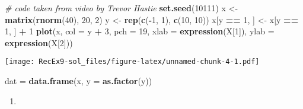 \documentclass[]{article}
\newenvironment{Shaded}{\begin{snugshade}}{\end{snugshade}}
\newcommand{\CommentTok}[1]{\textcolor[rgb]{0.56,0.35,0.01}{\textit{#1}}}
\newcommand{\DataTypeTok}[1]{\textcolor[rgb]{0.13,0.29,0.53}{#1}}
\newcommand{\DecValTok}[1]{\textcolor[rgb]{0.00,0.00,0.81}{#1}}
\newcommand{\KeywordTok}[1]{\textcolor[rgb]{0.13,0.29,0.53}{\textbf{#1}}}
\newcommand{\NormalTok}[1]{#1}
\newcommand{\OperatorTok}[1]{\textcolor[rgb]{0.81,0.36,0.00}{\textbf{#1}}}
\newcommand{\StringTok}[1]{\textcolor[rgb]{0.31,0.60,0.02}{#1}}
\begin{document}
\begin{Shaded}
\begin{Highlighting}[]
\CommentTok{# code taken from video by Trevor Hastie}
\KeywordTok{set.seed}\NormalTok{(}\DecValTok{10111}\NormalTok{)}
\NormalTok{x <-}\StringTok{ }\KeywordTok{matrix}\NormalTok{(}\KeywordTok{rnorm}\NormalTok{(}\DecValTok{40}\NormalTok{), }\DecValTok{20}\NormalTok{, }\DecValTok{2}\NormalTok{)}
\NormalTok{y <-}\StringTok{ }\KeywordTok{rep}\NormalTok{(}\KeywordTok{c}\NormalTok{(}\OperatorTok{-}\DecValTok{1}\NormalTok{, }\DecValTok{1}\NormalTok{), }\KeywordTok{c}\NormalTok{(}\DecValTok{10}\NormalTok{, }\DecValTok{10}\NormalTok{))}
\NormalTok{x[y }\OperatorTok{==}\StringTok{ }\DecValTok{1}\NormalTok{, ] <-}\StringTok{ }\NormalTok{x[y }\OperatorTok{==}\StringTok{ }\DecValTok{1}\NormalTok{, ] }\OperatorTok{+}\StringTok{ }\DecValTok{1}
\KeywordTok{plot}\NormalTok{(x, }\DataTypeTok{col =}\NormalTok{ y }\OperatorTok{+}\StringTok{ }\DecValTok{3}\NormalTok{, }\DataTypeTok{pch =} \DecValTok{19}\NormalTok{, }\DataTypeTok{xlab =} \KeywordTok{expression}\NormalTok{(X[}\DecValTok{1}\NormalTok{]), }\DataTypeTok{ylab =} \KeywordTok{expression}\NormalTok{(X[}\DecValTok{2}\NormalTok{]))}
\end{Highlighting}
\end{Shaded}

\texttt{[image: RecEx9-sol\_files/figure-latex/unnamed-chunk-4-1.pdf]}

\begin{Shaded}
\begin{Highlighting}[]
\NormalTok{dat =}\StringTok{ }\KeywordTok{data.frame}\NormalTok{(x, }\DataTypeTok{y =} \KeywordTok{as.factor}\NormalTok{(y))}
\end{Highlighting}
\end{Shaded}

\begin{enumerate}
\def\labelenumi{(\alph{enumi})}
\item
\end{enumerate}
\end{document}
